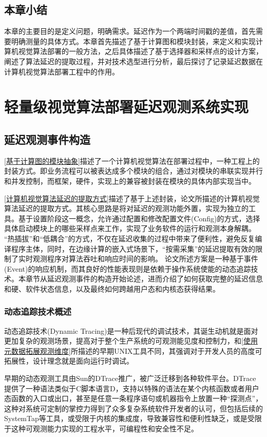 \documentclass[master,anonymous]{shtthesis}
\begin{document}
\section{本章小结}
本章的主要目的是定义问题，明确需求。延迟作为一个两端时间戳的差值，首先需要明确测量的具体方式。本章首先描述了基于计算图和模块封装，来定义和实现计算机视觉算法部署的一般方法，之后具体描述了基于选择器和采样点的设计方案，阐述了算法延迟的提取过程，并对技术选型进行分析，最后探讨了记录延迟数据在计算机视觉算法部署工程中的作用。

\chapter{轻量级视觉算法部署延迟观测系统实现}\label{轻量级视觉算法部署延迟观测系统实现}

\section{延迟观测事件构造}\label{延迟观测事件构造}
\ref{基于计算图的模块抽象}描述了一个计算机视觉算法在部署过程中，一种工程上的封装方式。即业务流程可以被表达成多个模块的组合，通过对模块的串联实现并行和并发控制，而框架，硬件，实现上的兼容被封装在模块的具体内部实现当中。

\ref{计算机视觉算法延迟的提取方式}描述了基于上述封装，论文所描述的计算机视觉算法延迟的提取方式。其核心思路是将对延迟的观测功能外置，实现为独立的工具。基于设置阶段这一概念，允许通过配置和修改配置文件(Config)的方式，选择具体启动模块上的哪些采样点来工作，实现了业务软件的运行和观测本身解耦。
“热插拔”和“低耦合”的方式，不仅在延迟收集的过程中带来了便利性，避免反复编译程序主体，同时，在边缘计算的嵌入式场景下，“按需采集”的延迟提取有效的限制了实时观测程序对算法吞吐和响应时间的影响。
论文所述方案是一种基于事件(Event)的响应机制，而其良好的性能表现则是依赖于操作系统使能的动态追踪技术。本章节从延迟观测事件的构造开始论述，进而介绍了如何获取完整的延迟信息和硬、软件状态信息，以及最终如何跨越用户态和内核态获得结果。
\subsection{动态追踪技术概述}\label{动态追踪技术概述}
动态追踪技术(Dynamic Tracing)\cite{keniston2007ptrace}是一种后现代的调试技术，其诞生动机就是面对更加复杂的观测场景，提高对于整个生产系统的可观测能见度和控制力，和\ref{使用元数据拓展观测维度}所描述的早期UNIX工具不同，其强调对于开发人员的高度可拓展性，设计理念就是面向运行时调试。

早期的动态观测工具由Sun的DTrace\cite{gregg2011dtrace}推广，被广泛迁移到各种软件平台。DTrace提供了一种语法类似于C脚本语言D，支持以特殊的语法在某个内核函数或者用户态函数的入口或出口，甚至是任意一条程序语句或机器指令上放置一种“探测点”，这种对系统可定制的掌控力得到了众多复杂系统软件开发者的认可，但包括后续的SystemTap\cite{prasad2005locating}等工具，或受限于内核的集成度，导致兼容性和便利性缺乏，或是受限于这种可观测能力实现的工程水平，可编程性和安全性不足。
\end{document}
